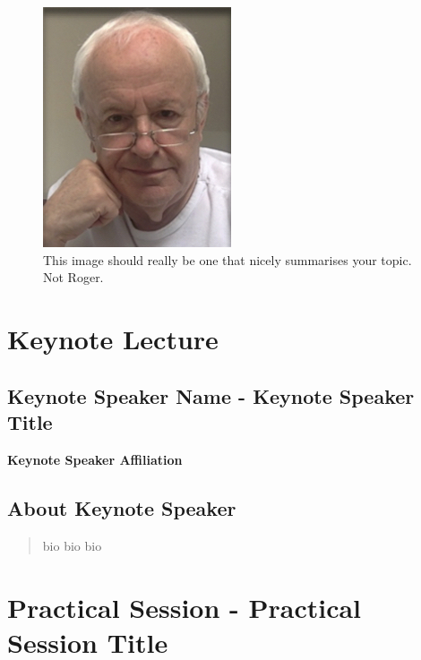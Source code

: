\documentclass[12pt,]{book}
\begin{document}
\begin{figure}
\includegraphics[width=2.19in]{assets/RPF-thumbnail} \caption{This image should really be one that nicely summarises your topic. Not Roger.}\label{fig:mainp}
\end{figure}

\section*{Keynote Lecture}\label{keynote-lecture-6}

\subsection*{Keynote Speaker Name - Keynote Speaker
Title}\label{keynote-speaker-name---keynote-speaker-title-2}

\textbf{Keynote Speaker Affiliation}

\subsection*{About Keynote Speaker}\label{about-keynote-speaker-2}

\begin{quote}
bio bio bio
\end{quote}

\section*{Practical Session - Practical Session
Title}\label{practical-session---practical-session-title-2}
\end{document}
